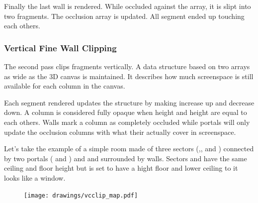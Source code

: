 Finally the last wall is rendered. While occluded against the array, it is slipt into two fragments. The occlusion array is updated. All segment ended up touching each others. 
\begin{minipage}{0.54\textwidth}
\centering
{}
\end{minipage}
\begin{minipage}{0.46\textwidth}
\centering
{}
\end{minipage}
\par

\subsubsection{Vertical Fine Wall Clipping}
The second pass clips fragments vertically. A data structure based on two arrays as wide as the 3D canvas is maintained. It describes how much screenspace is still available for each column in the canvas.\\
\par
 Each segment rendered updates the structure by making  increase up  and  decrease down. A column is considered fully opaque when  height and  height are equal to each others. Walls mark a column as completely occluded while portals will only update the occlusion columns with what their actually cover in screenspace.\\
\par
{}
\par
Let's take the example of a simple room made of three sectors (,, and ) connected by two portals ( and ) and and surrounded by walls. Sectors  and  have the same ceiling and floor height but  is set to have a hight floor and lower ceiling to it looks like a window.\\
\par

\begin{figure}
\centering
\texttt{[image: drawings/vcclip\_map.pdf]}
\end{figure}


